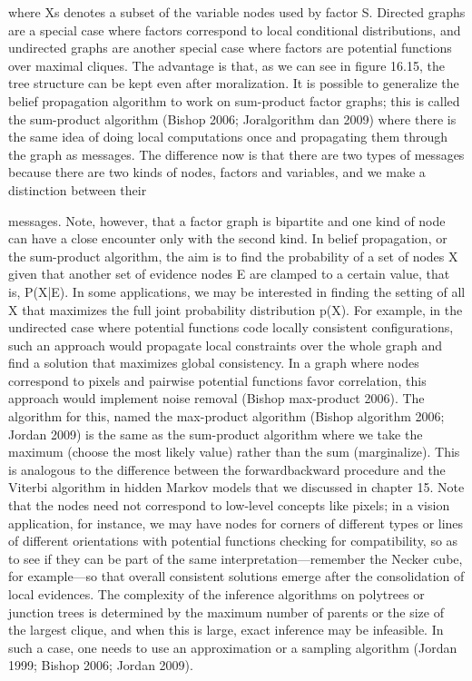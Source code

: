 where Xs denotes a subset of the variable nodes used by factor S. Directed graphs are a special case where factors correspond to local conditional distributions, and undirected graphs are another special case where factors are potential functions over maximal cliques. The advantage is that, as we can see in figure 16.15, the tree structure can be kept even after moralization. It is possible to generalize the belief propagation algorithm to work on sum-product factor graphs; this is called the sum-product algorithm (Bishop 2006; Joralgorithm dan 2009) where there is the same idea of doing local computations once and propagating them through the graph as messages. The difference now is that there are two types of messages because there are two kinds of nodes, factors and variables, and we make a distinction between their

messages. Note, however, that a factor graph is bipartite and one kind of node can have a close encounter only with the second kind. In belief propagation, or the sum-product algorithm, the aim is to find the probability of a set of nodes X given that another set of evidence nodes E are clamped to a certain value, that is, P(X|E). In some applications, we may be interested in finding the setting of all X that maximizes the full joint probability distribution p(X). For example, in the undirected case where potential functions code locally consistent configurations, such an approach would propagate local constraints over the whole graph and find a solution that maximizes global consistency. In a graph where nodes correspond to pixels and pairwise potential functions favor correlation, this approach would implement noise removal (Bishop max-product 2006). The algorithm for this, named the max-product algorithm (Bishop algorithm 2006; Jordan 2009) is the same as the sum-product algorithm where we take the maximum (choose the most likely value) rather than the sum (marginalize). This is analogous to the difference between the forwardbackward procedure and the Viterbi algorithm in hidden Markov models that we discussed in chapter 15. Note that the nodes need not correspond to low-level concepts like pixels; in a vision application, for instance, we may have nodes for corners of different types or lines of different orientations with potential functions checking for compatibility, so as to see if they can be part of the same interpretation---remember the Necker cube, for example---so that overall consistent solutions emerge after the consolidation of local evidences. The complexity of the inference algorithms on polytrees or junction trees is determined by the maximum number of parents or the size of the largest clique, and when this is large, exact inference may be infeasible. In such a case, one needs to use an approximation or a sampling algorithm (Jordan 1999; Bishop 2006; Jordan 2009).

